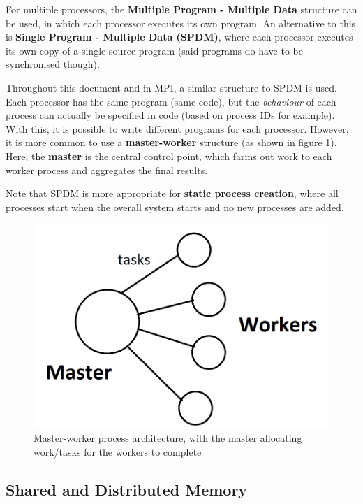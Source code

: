 \documentclass{article}
\begin{document}
For multiple processors, the \textbf{Multiple Program - Multiple Data} structure can be used, in which each processor executes its own program. An alternative to this is \textbf{Single Program - Multiple Data (SPDM)}, where each processor executes its own copy of a single source program (said programs do have to be synchronised though).

Throughout this document and in MPI, a similar structure to SPDM is used. Each processor has the same program (same code), but the \textit{behaviour} of each process can actually be specified in code (based on process IDs for example).  With this, it is possible to write different programs for each processor. However, it is more common to use a \textbf{master-worker} structure (as shown in figure \ref{fig:master-worker}). Here, the \textbf{master} is the central control point, which farms out work to each worker process and aggregates the final results.

Note that SPDM is more appropriate for \textbf{static process creation}, where all processes start when the overall system starts and no new processes are added.

\begin{figure}
	\centering
	\includegraphics[scale=0.3]{figures/master-worker.png}
	\caption{Master-worker process architecture, with the master allocating work/tasks for the workers to complete}
	\label{fig:master-worker}
\end{figure}

\subsection{Shared and Distributed Memory}
\end{document}
